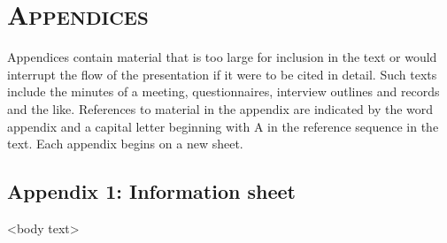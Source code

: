 %
%
% 
% 
% 

\chapter{\textsc{Appendices}}
\label{chap:app}

Appendices contain material that is too large for inclusion in the text or would interrupt the flow of the presentation if it were to be cited in detail. Such texts include the minutes of a meeting, questionnaires, interview outlines and records and the like. References to material in the appendix are indicated by the word appendix and a capital letter beginning with A in the reference sequence in the text. Each appendix begins on a new sheet.

\clearpage

\section{Appendix 1: Information sheet}

<body text>